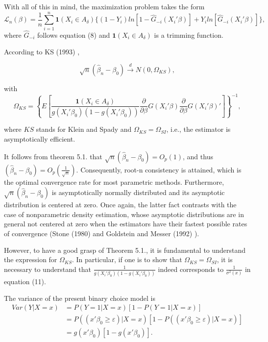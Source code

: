 \documentclass[a4paper]{article}
\begin{document}
With all of this in mind, the maximization problem takes the form
\begin{equation}
\mathcal{L}_n(\beta) = \frac{1}{n}\sum_{i=1}^n \mathbf{1}{(X_i \in A_\delta)} \{ (1 - Y_i)ln[ 1 - \hat{G}_{-i}(X_i'\beta)] +  Y_iln[\hat{G}_{-i}(X_i'\beta)]\},
\end{equation}
where $\hat{G}_{-i}$ follows equation (8) and $\mathbf{1}(X_i \in A_\delta)$ is a trimming function.

\begin{theorem}
According to KS (1993) \cite{[12]}, 

\[\sqrt{n}(\hat{\beta}_{n} - \beta_0) \stackrel{d}{\rightarrow} N(0,\Omega_{KS}),
\]

with  \[ \Omega_{KS} = \left\{ E\left[\frac{\mathbf{1}{(X_i \in A_\delta)}}{g(X_i'\beta_0)(1 - g(X_i'\beta_0))}\frac{\partial}{\partial \beta}
 G(X_i'\beta)\frac{\partial}{\partial \beta} G(X_i'\beta)' \right]\right\}^{-1}, \]
 
where $KS$ stands for Klein and Spady and $\Omega_{KS} = \Omega_{SI}$, i.e., the estimator is asymptotically efficient.

\end{theorem}

It follows from theorem 5.1. that $\sqrt{n}(\hat{\beta}_n - \beta_0)=O_p(1)$, and thus $(\hat{\beta}_n - \beta_0) = O_p\left(\frac{1}{\sqrt{n}}\right)$.  Consequently, root-n consistency is attained, which is the optimal convergence rate for most parametric methods. Furthermore, $\sqrt{n}(\hat{\beta}_n - \beta_0)$ is asymptotically normally distributed and its asymptotic distribution is centered at zero. Once again, the latter fact contrasts with the case of nonparametric density estimation, whose asymptotic distributions are in general not centered at zero when the estimators have their fastest possible rates of convergence (Stone (1980) \cite{[15]} and Goldstein and Messer (1992) \cite{[16]}). 

However, to have a good grasp of Theorem 5.1., it is fundamental to understand the expression for $\Omega_{KS}$. In particular, if one is to show that $\Omega_{KS} = \Omega_{SI}$, it is necessary to understand that $\frac{1}{g(X_i'\beta_0)(1 - g(X_i'\beta_0))}$ indeed corresponds to $\frac{1}{\sigma^2(x)}$ in equation (11). 

The variance of the present binary choice model is %
\begin{align*}
Var(Y|X = x) & = P(Y = 1|X = x)[1 - P(Y = 1|X = x)] \\
&=P((x'\beta_0 \geq \varepsilon)|X = x)[1 - P((x'\beta_0 \geq \varepsilon)|X = x)] \\
&= g(x'\beta_0)[1 - g(x'\beta_0)].
\end{align*} 
\end{document}
